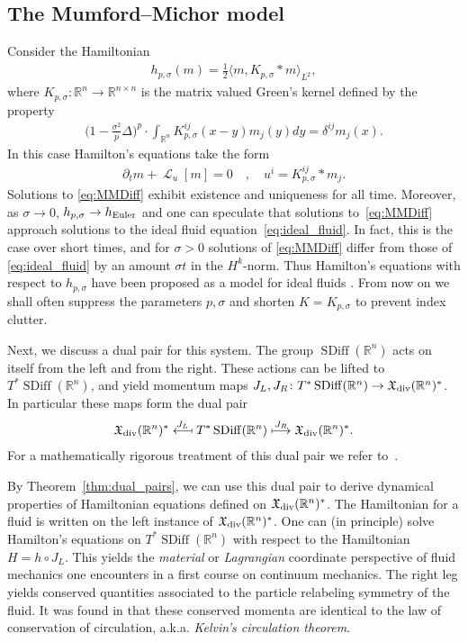 \documentclass[12pt]{amsart}
\newcommand{\R}{\ensuremath{\mathbb{R}}}
\DeclareMathOperator{\SDiff}{SDiff}
\DeclareMathOperator{\lie}{\mathcal{L}}
\begin{document}
\subsection{The Mumford--Michor model}
\label{sec:MME}
Consider the Hamiltonian
\begin{align*}
  h_{p,\sigma}(m) = \frac{1}{2} \langle m , K_{p,\sigma} * m \rangle_{L^2},
\end{align*}
where $K_{p,\sigma}:\R^n \to \mathbb{R}^{n \times n}$ is the matrix
valued Green's kernel defined by the property
\begin{align*}
 \Big(1 - \frac{\sigma^2}{p} \Delta \Big)^p \cdot \int_{\R^n} K_{p,\sigma}^{ij}(x - y) m_j(y) dy = \delta^{ij} m_j(x).
\end{align*}
In this case Hamilton's equations take the form
\begin{align}
	\partial_t m+ \lie_u [ m] = 0 \quad , \quad u^i  = K^{ij}_{p,\sigma} * m_j. \label{eq:MMDiff}
\end{align}
Solutions to \eqref{eq:MMDiff} exhibit existence and uniqueness for all time.
Moreover, as $\sigma \to 0$, $h_{p,\sigma} \to h_{\rm Euler}$ and one
can speculate that solutions to~\eqref{eq:MMDiff}
approach solutions to the ideal fluid equation~\eqref{eq:ideal_fluid}.
In fact, this is the case over short times, and for $\sigma > 0$ solutions of \eqref{eq:MMDiff}
differ from those of \eqref{eq:ideal_fluid} by an amount $\sigma t$
in the $H^k$-norm.
Thus Hamilton's equations with respect to $h_{p,\sigma}$ have been proposed
as a model for ideal fluids \cite[Theorems 2 and 3]{MumfordMichor2013}. From now on we shall often suppress the
parameters $p,\sigma$ and shorten $K = K_{p,\sigma}$ to prevent index
clutter.

Next, we discuss a dual pair for this system.
The group $\SDiff(\R^n)$ acts on itself from the left and from the right.
These actions can be lifted to $T^* \SDiff(\R^n)$, and yield
momentum maps $J_L,J_R\colon T^*\SDiff(\R^n) \to \mathfrak{X}_{\rm div}(\R^n)^*$. In particular these maps form the dual pair
\begin{align*}
  \mathfrak{X}_{\rm div}(\R^n)^*
  \stackrel{J_L}{\longmapsfrom}
  T^* \SDiff(\R^n)
  \stackrel{J_R}{\longmapsto}
  \mathfrak{X}_{\rm div}(\R^n)^*.
\end{align*}
For a mathematically rigorous treatment of this dual pair we refer to~\cite{GayBalmazVizman2012}.

By Theorem~\ref{thm:dual_pairs}, we can use this dual pair to derive dynamical properties of Hamiltonian equations defined on $\mathfrak{X}_{\rm div}(\R^n)^*$.
The Hamiltonian for a fluid is written on the left instance of $\mathfrak{X}_{\rm div}(\R^n)^*$.
One can (in principle) solve Hamilton's equations on $T^*\SDiff(\R^n)$
with respect to the Hamiltonian $H = h \circ J_L$.
This yields the \emph{material} or \emph{Lagrangian} coordinate perspective
of fluid mechanics one encounters in a first course on continuum
mechanics.
The right leg yields conserved quantities associated to the particle relabeling symmetry of the fluid.
It was found in \cite{Arnold1966} that these conserved momenta are identical
to the law of conservation of circulation, a.k.a. \emph{Kelvin's circulation theorem}.
\end{document}
